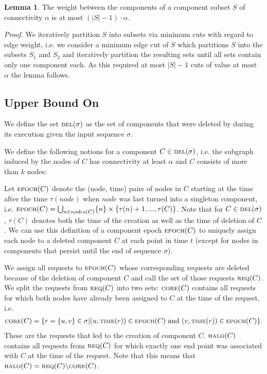 \documentclass[a4paper,xcolor=dvipsnames, tikz, 12pt]{article}
\newcommand{\crep}{\text{C{\scriptsize REP}}}
\newcommand{\del}{\text{\scriptsize DEL}}
\newcommand{\core}{\text{\scriptsize CORE}}
\newcommand{\halo}{\text{\scriptsize HALO}}
\newcommand{\req}{\text{\scriptsize REQ}}
\newcommand{\epoch}{\text{\scriptsize EPOCH}}
\newcommand{\reqTime}{\text{\scriptsize TIME}}
\theoremstyle{definition}
\newtheorem{lemma}[defi]{Lemma}
\begin{document}
\begin{lemma}
	\label{cut_lemma_upper}
	The weight between the components of a component subset $S$ of connectivity $\alpha$ is at most $(|S|-1)\cdot\alpha$.
\end{lemma}
\textit{Proof.} We iteratively partition $S$ into subsets via minimum cuts with regard to edge weight, i.e. we consider a minimum edge cut of $S$ which partitions $S$ into the subsets $S_1$ and $S_2$ and iteratively partition the resulting sets until all sets contain only one component each. As this required at most $|S|-1$ cuts of value at most $\alpha$ the lemma follows.

\subsection{Upper Bound On \crep{}}

We define the set $\del(\sigma)$ as the set of components that were deleted by \crep{} during its execution given the input sequence $\sigma$.

We define the following notions for a component $C\in\del{}(\sigma)$, i.e. the subgraph induced by the nodes of $C$ has connectivity at least $\alpha$ and $C$ consists of more than $k$ nodes:

Let $\epoch{}(C)$ denote the (node, time) pairs of nodes in $C$ starting at the time after the time $\tau(node)$ when $node$ was last turned into a singleton component, i.e. $\epoch{}(C)=\bigcup_{n\in nodes(C)}\{n\}\times\{\tau(n)+1,...,\tau(C)\}$. Note that for $C\in\del(\sigma)$, $\tau(C)$ denotes both the time of the creation as well as the time of deletion of $C$. We can use this definition of a component epoch $\epoch(C)$ to uniquely assign each node to a deleted component $C$ at each point in time $t$ (except for nodes in components that persist until the end of sequence $\sigma$).

We assign all requests to $\epoch(C)$ whose corresponding requests are deleted because of the deletion of component $C$ and call the set of those requests $\req(C)$.
We split the requests from $\req{}(C)$ into two sets: $\core(C)$ contains all requests for which both nodes have already been assigned to $C$ at the time of the request, i.e. 
\begin{align*}
\core(C)=\{r=\{u,v\}\in\sigma| (u,\reqTime(r))\in \epoch(C)\text{ and } (v, \reqTime(r))\in \epoch(C)\}.
\end{align*}
These are the requests that led to the creation of component $C$. 
$\halo(C)$ contains all requests from $\req(C)$ for which exactly one end point was associated with $C$ at the time of the request. Note that this means that $\halo(C)=\req(C)\backslash \core(C)$.
\end{document}
